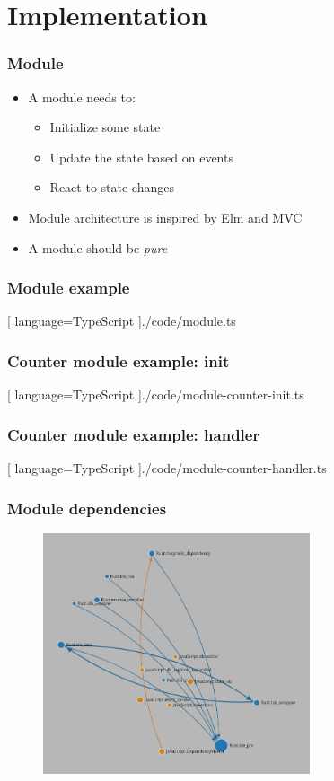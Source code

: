 \section{Implementation}
\SectionPage

\begin{frame}
  \frametitle{Module}
  \begin{itemize}
    \pause
    \item A module needs to:
      \pause
      \begin{itemize}
        \item Initialize some state
        \pause
        \item Update the state based on events
        \pause
        \item React to state changes
      \end{itemize}
      \pause
    \item Module architecture is inspired by Elm and MVC
      \pause
    \item A module should be \textit{pure}
  \end{itemize}
\end{frame}

\begin{frame}
  \frametitle{Module example}
  \begin{center}
    
    [ language=TypeScript
    ]{./code/module.ts}
  \end{center}
\end{frame}

\begin{frame}
  \frametitle{Counter module example: init}
  \begin{center}
    
    [ language=TypeScript
    ]{./code/module-counter-init.ts}
  \end{center}
\end{frame}

\begin{frame}
  \frametitle{Counter module example: handler}
  \begin{center}
    
    [ language=TypeScript
    ]{./code/module-counter-handler.ts}
  \end{center}
\end{frame}


\begin{frame}
  \frametitle{Module dependencies}
  \begin{figure}
    \centering
      \includegraphics[width=0.7\textwidth]{./pics/module-dependencies.png}
  \end{figure}
\end{frame}

